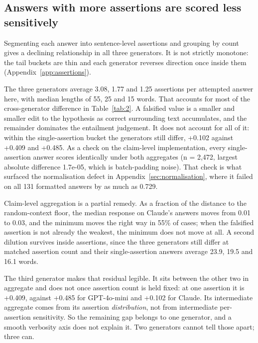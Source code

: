 \documentclass[11pt]{article}
\begin{document}
\subsection{Answers with more assertions are scored less sensitively}
\label{sec:assertions}

Segmenting each answer into sentence-level assertions and grouping by count gives a declining relationship in all three generators. It is not strictly monotone: the tail buckets are thin and each generator reverses direction once inside them (Appendix~\ref{app:assertions}).

The three generators average 3.08, 1.77 and 1.25 assertions per attempted answer here, with median lengths of 55, 25 and 15 words. That accounts for most of the cross-generator difference in Table~\ref{tab:2}. A falsified value is a smaller and smaller edit to the hypothesis as correct surrounding text accumulates, and the remainder dominates the entailment judgement. It does not account for all of it: within the single-assertion bucket the generators still differ, +0.102 against +0.409 and +0.485. As a check on the claim-level implementation, every single-assertion answer scores identically under both aggregates (n = 2,472, largest absolute difference 1.7e-05, which is batch-padding noise). That check is what surfaced the normalisation defect in Appendix~\ref{sec:normalisation}, where it failed on all 131 formatted answers by as much as 0.729.

Claim-level aggregation is a partial remedy. As a fraction of the distance to the random-context floor, the median response on Claude's answers moves from 0.01 to 0.03, and the minimum moves the right way in 55\% of cases; when the falsified assertion is not already the weakest, the minimum does not move at all. A second dilution survives inside assertions, since the three generators still differ at matched assertion count and their single-assertion answers average 23.9, 19.5 and 16.1 words.

The third generator makes that residual legible. It sits between the other two in aggregate and does not once assertion count is held fixed: at one assertion it is +0.409, against +0.485 for GPT-4o-mini and +0.102 for Claude. Its intermediate aggregate comes from its assertion \emph{distribution}, not from intermediate per-assertion sensitivity. So the remaining gap belongs to one generator, and a smooth verbosity axis does not explain it. Two generators cannot tell those apart; three can.
\end{document}
